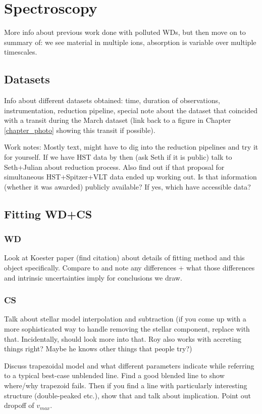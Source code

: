 \chapter{Spectroscopy}
\label{chapter_spectra}


More info about previous work done with polluted WDs, but then move on to summary of: we see material in multiple ions, absorption is variable over multiple timescales.

\section{Datasets}
\label{spectra_datasets}
Info about different datasets obtained: time, duration of observations, instrumentation, reduction pipeline, special note about the dataset that coincided with a transit during the March dataset (link back to a figure in Chapter \ref{chapter_photo} showing this transit if possible).

Work notes: Mostly text, might have to dig into the reduction pipelines and try it for yourself. If we have HST data by then (ask Seth if it is public) talk to Seth+Julian about reduction process. Also find out if that proposal for simultaneous HST+Spitzer+VLT data ended up working out. Is that information (whether it was awarded) publicly available? If yes, which have accessible data?

\section{Fitting WD+CS}
\label{spectra_fitting}
\subsection{WD}
Look at Koester paper (find citation) about details of fitting method and this object specifically. Compare to \cite{Xu2016} and note any differences + what those differences and intrinsic uncertainties imply for conclusions we draw.

\subsection{CS}
Talk about stellar model interpolation and subtraction (if you come up with a more sophisticated way to handle removing the stellar component, replace with that. Incidentally, should look more into that. Roy also works with accreting things right? Maybe he knows other things that people try?)

Discuss trapezoidal model and what different parameters indicate while referring to a typical best-case unblended line. Find a good blended line to show where/why trapezoid fails. Then if you find a line with particularly interesting structure (double-peaked etc.), show that and talk about implication. Point out dropoff of $v_{max}$. 

